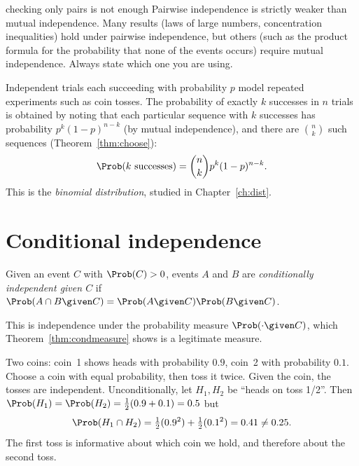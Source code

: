 \begin{nuance}{checking only pairs is not enough}
Pairwise independence is strictly weaker than mutual independence. Many results
(laws of large numbers, concentration inequalities) hold under pairwise
independence, but others (such as the product formula for the probability that
none of the events occurs) require mutual independence. Always state which one
you are using.
\end{nuance}

\begin{example}\label{ex:trials}
Independent trials each succeeding with probability $p$ model repeated
experiments such as coin tosses. The probability of exactly $k$ successes in $n$
trials is obtained by noting that each particular sequence with $k$ successes
has probability $p^k(1-p)^{n-k}$ (by mutual independence), and there are
$\binom nk$ such sequences (Theorem~\ref{thm:choose}):
\[
\Prob(k\text{ successes})=\binom nk p^k(1-p)^{n-k}.
\]
This is the \emph{binomial distribution}, studied in Chapter~\ref{ch:dist}.
\end{example}

\section{Conditional independence}

\begin{definition}
Given an event $C$ with $\Prob(C)>0$, events $A$ and $B$ are \emph{conditionally
independent given $C$} if $\Prob(A\cap B\given C)=\Prob(A\given C)\Prob(B\given C)$.
\end{definition}

This is independence under the probability measure $\Prob(\cdot\given C)$,
which Theorem~\ref{thm:condmeasure} shows is a legitimate measure.

\begin{example}\label{ex:condind}
Two coins: coin~1 shows heads with probability $0.9$, coin~2 with probability
$0.1$. Choose a coin with equal probability, then toss it twice. Given the coin,
the tosses are independent. Unconditionally, let $H_1,H_2$ be ``heads on toss
1/2''. Then $\Prob(H_1)=\Prob(H_2)=\frac12(0.9+0.1)=0.5$ but
\[
\Prob(H_1\cap H_2)=\tfrac12(0.9^2)+\tfrac12(0.1^2)=0.41\ne0.25 .
\]
The first toss is informative about which coin we hold, and therefore about the
second toss.
\end{example}

